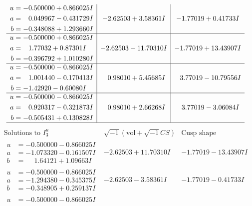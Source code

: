 \documentclass[1p]{elsarticle_modified}
\theoremstyle{definition}
\newcommand{\I}{\sqrt{-1}}
\begin{document}
$$\begin{array}{c|c|c}
\begin{aligned}
u &= -0.500000 + 0.866025 I \\
a &= \phantom{-}0.049967 - 0.431729 I \\
b &= -0.348088 + 1.293660 I\end{aligned}
 & -2.62503 + 3.58361 I & -1.77019 + 0.41733 I \\ \hline\begin{aligned}
u &= -0.500000 + 0.866025 I \\
a &= \phantom{-}1.77032 + 0.87301 I \\
b &= -0.396792 + 1.010280 I\end{aligned}
 & -2.62503 - 11.70310 I & -1.77019 + 13.43907 I \\ \hline\begin{aligned}
u &= -0.500000 - 0.866025 I \\
a &= \phantom{-}1.001440 - 0.170413 I \\
b &= -1.42920 - 0.60080 I\end{aligned}
 & \phantom{-}0.98010 + 5.45685 I & \phantom{-}3.77019 - 10.79556 I \\ \hline\begin{aligned}
u &= -0.500000 - 0.866025 I \\
a &= \phantom{-}0.920317 - 0.321873 I \\
b &= -0.505431 + 0.130828 I\end{aligned}
 & \phantom{-}0.98010 + 2.66268 I & \phantom{-}3.77019 - 3.06084 I\\
 \hline 
 \end{array}$$\newpage$$\begin{array}{c|c|c}  
\text{Solutions to }I^u_{3}& \I (\text{vol} + \sqrt{-1}CS) & \text{Cusp shape}\\
 \hline 
\begin{aligned}
u &= -0.500000 - 0.866025 I \\
a &= -1.073320 - 0.161507 I \\
b &= \phantom{-}1.64121 + 1.09663 I\end{aligned}
 & -2.62503 + 11.70310 I & -1.77019 - 13.43907 I \\ \hline\begin{aligned}
u &= -0.500000 - 0.866025 I \\
a &= -1.294380 - 0.345375 I \\
b &= -0.348905 + 0.259137 I\end{aligned}
 & -2.62503 - 3.58361 I & -1.77019 - 0.41733 I \\ \hline\begin{aligned}
u &= -0.500000 - 0.866025 I \\

\end{aligned}
\end{array}$$
\end{document}
